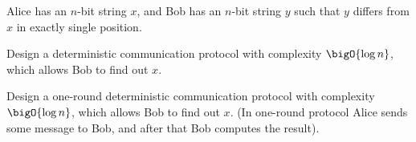 Alice has an $n$-bit string $x$, and Bob has an $n$-bit string $y$ such that $y$ differs from $x$ in
exactly single position.
\begin{enumcyr}
    \item Design a deterministic communication protocol with complexity $\bigO{\log n}$, which allows Bob
        to find out $x$.
    \item Design a one-round deterministic communication protocol with complexity $\bigO{\log n}$, which
        allows Bob to find out $x$. (In one-round protocol Alice sends some message to Bob, and after
        that Bob computes the result). 
\end{enumcyr}